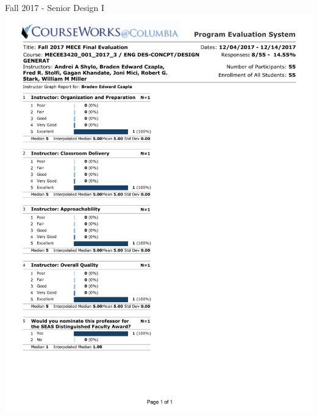 \newpage Fall 2017 - Senior Design I
\includegraphics*[width=\textwidth, page=1, trim={0.25in 1in 0.25in 0.25in}]{./Teaching_Evaluations/BradenCzapla_TAEvaluation_Fall2017.pdf}

